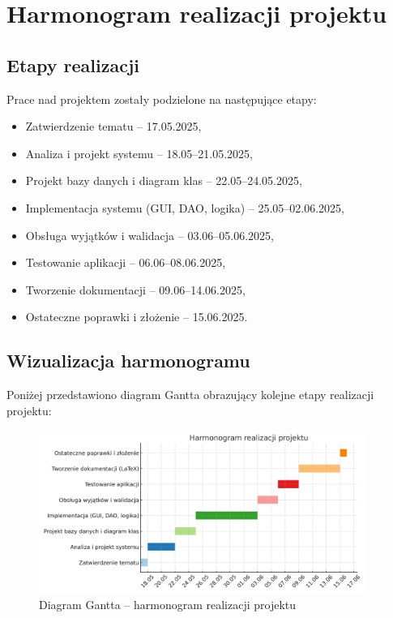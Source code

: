 \chapter{Harmonogram realizacji projektu}

\section{Etapy realizacji}

Prace nad projektem zostały podzielone na następujące etapy:

\begin{itemize}
  \item Zatwierdzenie tematu – 17.05.2025,
  \item Analiza i projekt systemu – 18.05–21.05.2025,
  \item Projekt bazy danych i diagram klas – 22.05–24.05.2025,
  \item Implementacja systemu (GUI, DAO, logika) – 25.05–02.06.2025,
  \item Obsługa wyjątków i walidacja – 03.06–05.06.2025,
  \item Testowanie aplikacji – 06.06–08.06.2025,
  \item Tworzenie dokumentacji – 09.06–14.06.2025,
  \item Ostateczne poprawki i złożenie – 15.06.2025.
\end{itemize}

\section{Wizualizacja harmonogramu}

Poniżej przedstawiono diagram Gantta obrazujący kolejne etapy realizacji projektu:

\begin{figure}[H]
\centering
\includegraphics[width=0.95\textwidth]{figures/harmonogram_gantta.png}
\caption{Diagram Gantta – harmonogram realizacji projektu}
\end{figure}
